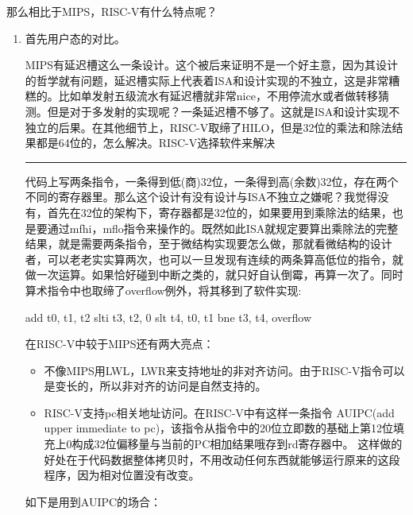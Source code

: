 \documentclass{article}
\newcommand{\chinesedash}{\rule[.7ex]{\widthof{二字}}{0.5pt}}
\begin{document}
那么相比于MIPS，RISC-V有什么特点呢？
\begin{enumerate}
	\item 首先用户态的对比。
	
	MIPS有延迟槽这么一条设计。这个被后来证明不是一个好主意，因为其设计的哲学就有问题，延迟槽实际上代表着ISA和设计实现的不独立，这是非常糟糕的。比如单发射五级流水有延迟槽就非常nice，不用停流水或者做转移猜测。但是对于多发射的实现呢？一条延迟槽不够了。这就是ISA和设计实现不独立的后果。在其他细节上，RISC-V取缔了HILO，但是32位的乘法和除法结果都是64位的，怎么解决。RISC-V选择软件来解决\chinesedash 代码上写两条指令，一条得到低(商)32位，一条得到高(余数)32位，存在两个不同的寄存器里。那么这个设计有没有设计与ISA不独立之嫌呢？我觉得没有，首先在32位的架构下，寄存器都是32位的，如果要用到乘除法的结果，也是要通过mfhi，mflo指令来操作的。既然如此ISA就规定要算出乘除法的完整结果，就是需要两条指令，至于微结构实现要怎么做，那就看微结构的设计者，可以老老实实算两次，也可以一旦发现有连续的两条算高低位的指令，就做一次运算。如果恰好碰到中断之类的，就只好自认倒霉，再算一次了。同时算术指令中也取缔了overflow例外，将其移到了软件实现:~\cite{user}
	\begin{scala}
		add t0, t1, t2
		slti t3, t2, 0
		slt t4, t0, t1
		bne t3, t4, overflow
	\end{scala}
	
	在RISC-V中较于MIPS还有两大亮点：
	\begin{itemize}
		\item 不像MIPS用LWL，LWR来支持地址的非对齐访问。由于RISC-V指令可以是变长的，所以非对齐的访问是自然支持的。
		\item RISC-V支持pc相关地址访问。在RISC-V中有这样一条指令 AUIPC(add upper immediate to pc)，该指令从指令中的20位立即数的基础上第12位填充上0构成32位偏移量与当前的PC相加结果哦存到rd寄存器中。
	这样做的好处在于代码数据整体拷贝时，不用改动任何东西就能够运行原来的这段程序，因为相对位置没有改变。
	\end{itemize}
	如下是用到AUIPC的场合：~\cite{user}
		

\end{enumerate}
\end{document}
